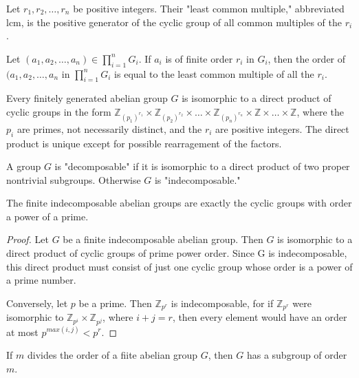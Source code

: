 \documentclass[a4paper,8pt]{article}
\begin{document}
\begin{outline}
    Let \(r_{1}, r_{2}, \ldots, r_{n}\) be positive integers. Their "least common multiple,"
    abbreviated lcm, is the positive generator of the cyclic group of all common multiples of the \(r_{i}\).

    Let \((a_{1}, a_{2}, \ldots, a_{n}) \in \prod_{i=1}^{n} G_{i}\). If \(a_{i}\) is of
    finite order \(r_{i}\) in \(G_{i}\), then the order of \((a_{1}, a_{2}, \ldots, a_{n}\) in
    \(\prod_{i=1}^{n} G_{i}\) is equal to the least common multiple of all the \(r_{i}\).

    Every finitely generated abelian group \(G\) is isomorphic to a direct product of cyclic groups in
    the form \(\mathbb{Z}_{(p_{1})^{r_{1}}} \times \mathbb{Z}_{(p_{2})^{r_{2}}} \times \ldots \times
    \mathbb{Z}_{(p_{n})^{r_{n}}} \times \mathbb{Z} \times \ldots \times \mathbb{Z}\), where the \(p_{i}\)
    are primes, not necessarily distinct, and the \(r_{i}\) are positive integers. The direct product is
    unique except for possible rearragement of the factors.

    A group \(G\) is "decomposable" if it is isomorphic to a direct product of two proper
    nontrivial subgroups. Otherwise \(G\) is "indecomposable."

    The finite indecomposable abelian groups are exactly the cyclic groups with order a power of a prime.

    \begin{proof}
      \forward
        Let \(G\) be a finite indecomposable abelian group. Then \(G\) is isomorphic to a
        direct product of cyclic groups of prime power order. Since G is indecomposable, this direct product
        must consist of just one cyclic group whose order is a power of a prime number.

      \backward
        Conversely, let \(p\) be a prime. Then \(\mathbb{Z}_{p^{r}}\) is indecomposable, for
        if \(\mathbb{Z}_{p^{r}}\) were isomorphic to \(\mathbb{Z}_{p^{i}} \times \mathbb{Z}_{p^{j}}\), where
        \(i + j = r\), then every element would have an order at most \(p^{max(i, j)} < p^{r}\).
    \end{proof}

    If \(m\) divides the order of a fiite abelian group \(G\), then \(G\) has a subgroup of order \(m\).


\end{outline}
\end{document}
